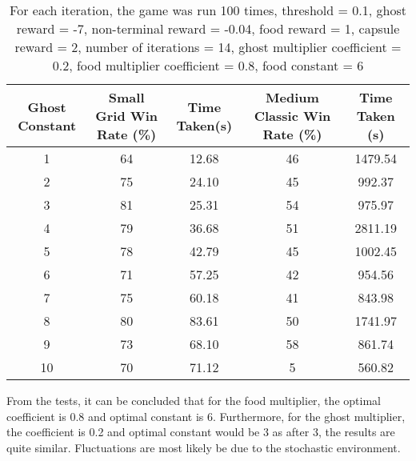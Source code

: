 \documentclass[12pt]{report}
\begin{document}
              \vspace{-9mm}
              \begin{table}[H]
                \begin{center}
                  \begin{adjustbox}{max width=\textwidth}
                    \begin{tabular}{*{5}{c}}
                      \textbf{Ghost Constant} & \textbf{Small Grid Win Rate (\%)} & \textbf{Time Taken(s)} & \textbf{Medium Classic Win Rate (\%)} & \textbf{Time Taken (s)}\\
                    \hline
                          1 & 64 & 12.68 & 46 & 1479.54 \\
                          2 & 75 & 24.10 & 45 & 992.37 \\
                          3 & 81 & 25.31 & 54 & 975.97 \\
                          4 & 79 & 36.68 & 51 & 2811.19 \\
                          5 & 78 & 42.79 & 45 & 1002.45 \\
                          6 & 71 & 57.25 & 42 & 954.56\\
                          7 & 75 & 60.18 & 41 & 843.98\\
                          8 & 80 & 83.61 & 50 & 1741.97 \\
                          9 & 73 & 68.10 & 58 & 861.74 \\
                          10 & 70 & 71.12 & 5 & 560.82 \\

                  \end{tabular}
                  \end{adjustbox}
                  \caption{For each iteration, the game was run 100 times, threshold = 0.1, ghost reward = -7, non-terminal reward = -0.04, food reward = 1, capsule reward = 2, number of iterations = 14, ghost multiplier coefficient = 0.2, food multiplier coefficient = 0.8, food constant = 6}
                  \label{tab:table4}
                \end{center}
              \end{table}
                \vspace{-9mm}
              \hspace{-8mm} From the tests, it can be concluded that for the food multiplier, the optimal coefficient is 0.8 and optimal constant is 6. Furthermore, for the ghost multiplier, the coefficient is 0.2 and optimal constant would be 3 as after 3, the results are quite similar. Fluctuations are most likely be due to the stochastic environment.
\end{document}
